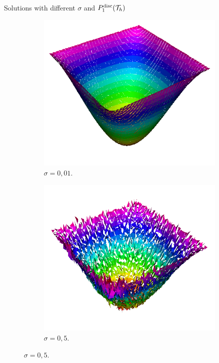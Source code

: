		\begin{frame}{Solutions with different $\sigma$ and $\relax{P}^{\text{disc}}_1(\mathcal{T}_h)$}
		
		\begin{figure}[h!]
			\begin{subfigure}[b]{0.27\textwidth}
				\centering
				\includegraphics[scale=0.18]{img/Difusion/Recortes/steady_diffusion_approx_sigma_0_01.png}
				\caption{\scriptsize $\sigma=0,01$.}
			\end{subfigure}
			\begin{subfigure}[b]{0.27\textwidth}
				\centering
				\includegraphics[scale=0.18]{img/Difusion/Recortes/steady_diffusion_approx_sigma_0_5.png}
				\caption{\scriptsize $\sigma=0,5$.}
			\end{subfigure}

\end{figure}
\end{frame}
